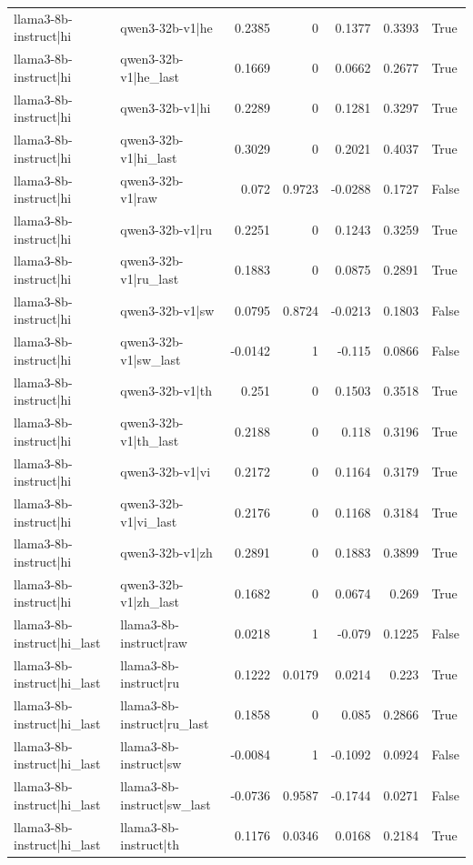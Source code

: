 \begin{table}
\begin{tabular}{l l r r r r l}
llama3-8b-instruct|hi & qwen3-32b-v1|he & 0.2385 & 0 & 0.1377 & 0.3393 & True \\
llama3-8b-instruct|hi & qwen3-32b-v1|he_last & 0.1669 & 0 & 0.0662 & 0.2677 & True \\
llama3-8b-instruct|hi & qwen3-32b-v1|hi & 0.2289 & 0 & 0.1281 & 0.3297 & True \\
llama3-8b-instruct|hi & qwen3-32b-v1|hi_last & 0.3029 & 0 & 0.2021 & 0.4037 & True \\
llama3-8b-instruct|hi & qwen3-32b-v1|raw & 0.072 & 0.9723 & -0.0288 & 0.1727 & False \\
llama3-8b-instruct|hi & qwen3-32b-v1|ru & 0.2251 & 0 & 0.1243 & 0.3259 & True \\
llama3-8b-instruct|hi & qwen3-32b-v1|ru_last & 0.1883 & 0 & 0.0875 & 0.2891 & True \\
llama3-8b-instruct|hi & qwen3-32b-v1|sw & 0.0795 & 0.8724 & -0.0213 & 0.1803 & False \\
llama3-8b-instruct|hi & qwen3-32b-v1|sw_last & -0.0142 & 1 & -0.115 & 0.0866 & False \\
llama3-8b-instruct|hi & qwen3-32b-v1|th & 0.251 & 0 & 0.1503 & 0.3518 & True \\
llama3-8b-instruct|hi & qwen3-32b-v1|th_last & 0.2188 & 0 & 0.118 & 0.3196 & True \\
llama3-8b-instruct|hi & qwen3-32b-v1|vi & 0.2172 & 0 & 0.1164 & 0.3179 & True \\
llama3-8b-instruct|hi & qwen3-32b-v1|vi_last & 0.2176 & 0 & 0.1168 & 0.3184 & True \\
llama3-8b-instruct|hi & qwen3-32b-v1|zh & 0.2891 & 0 & 0.1883 & 0.3899 & True \\
llama3-8b-instruct|hi & qwen3-32b-v1|zh_last & 0.1682 & 0 & 0.0674 & 0.269 & True \\
llama3-8b-instruct|hi_last & llama3-8b-instruct|raw & 0.0218 & 1 & -0.079 & 0.1225 & False \\
llama3-8b-instruct|hi_last & llama3-8b-instruct|ru & 0.1222 & 0.0179 & 0.0214 & 0.223 & True \\
llama3-8b-instruct|hi_last & llama3-8b-instruct|ru_last & 0.1858 & 0 & 0.085 & 0.2866 & True \\
llama3-8b-instruct|hi_last & llama3-8b-instruct|sw & -0.0084 & 1 & -0.1092 & 0.0924 & False \\
llama3-8b-instruct|hi_last & llama3-8b-instruct|sw_last & -0.0736 & 0.9587 & -0.1744 & 0.0271 & False \\
llama3-8b-instruct|hi_last & llama3-8b-instruct|th & 0.1176 & 0.0346 & 0.0168 & 0.2184 & True \\

\end{tabular}
\end{table}
